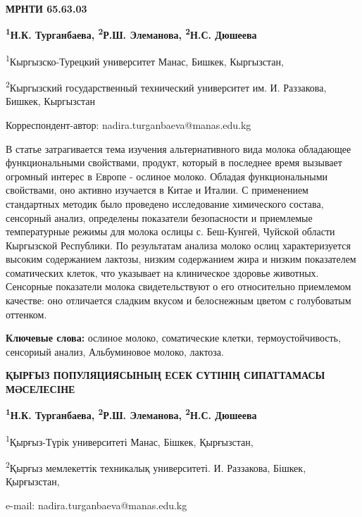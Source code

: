 \newpage
{\bfseries МРНТИ 65.63.03}


\begin{center}
{\bfseries \textsuperscript{1}Н.К. Турганбаева, \textsuperscript{2}Р.Ш. Элеманова, \textsuperscript{2}Н.С. Дюшеева}

\textsuperscript{1}Кыргызско-Турецкий университет Манас, Бишкек,
Кыргызстан,

\textsuperscript{2}Кыргызский государственный технический университет
им. И. Раззакова, Бишкек, Кыргызстан

Корреспондент-автор: nadira.turganbaeva@manas.edu.kg
\end{center}

В статье затрагивается тема изучения альтернативного вида молока
обладающее функциональными свойствами, продукт, который в последнее
время вызывает огромный интерес в Eвропе - ослиное молоко. Обладая
функциональными свойствами, оно активно изучается в Китае и Италии. С
применением стандартных методик было проведено исследование химического
состава, сенсорный анализ, определены показатели безопасности и
приемлемые температурные режимы для молока ослицы с. Беш-Кунгей, Чуйской
области Кыргызской Республики. По результатам анализа молоко ослиц
характеризуется высоким содержанием лактозы, низким содержанием жира и
низким показателем соматических клеток, что указывает на клиническое
здоровье животных. Сенсорные показатели молока свидетельствуют о его
относительно приемлемом качестве: оно отличается сладким вкусом и
белоснежным цветом с голубоватым оттенком.

{\bfseries Ключевые слова:} ослиное молоко, соматические клетки,
термоустойчивость, сенсориый анализ, Альбуминовое молоко, лактоза.

\begin{center}
{\large\bfseries ҚЫРҒЫЗ ПОПУЛЯЦИЯСЫНЫҢ ЕСЕК СҮТІНІҢ СИПАТТАМАСЫ МӘСЕЛЕСІНЕ}

{\bfseries \textsuperscript{1}Н.К. Турганбаева, \textsuperscript{2}Р.Ш. Элеманова, \textsuperscript{2}Н.С. Дюшеева}

\textsuperscript{1}Қырғыз-Түрік университеті Манас, Бішкек, Қырғызстан,

\textsuperscript{2}Қырғыз мемлекеттік техникалық университеті. И.
Раззакова, Бішкек, Қырғызстан,

e-mail: nadira.turganbaeva@manas.edu.kg
\end{center}

